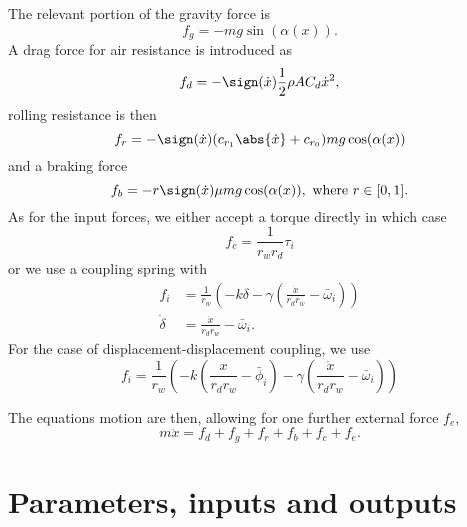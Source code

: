 \documentclass[10pt,notitlepage,abstracton]{scrartcl}
\theoremstyle{plain}
\theoremstyle{plain}
\theoremstyle{plain}
\begin{document}
The relevant portion of the gravity force is
\begin{equation}
  \label{eq:1}
  f_{g} = - m g \sin(\alpha ( x ) ).
\end{equation}
A drag force for air resistance is introduced as
\begin{equation}
  \label{eq:2}
  f_{d} = - \sign(\dot{x}) \frac{1}{2}\rho A C_{d} \dot{x}^{2},  
\end{equation}
rolling resistance is then
\begin{equation}
  \label{eq:3}
  f_{r} = - \sign(\dot{x})(c_{r_{1}}\abs{\dot{x}} + c_{r_{0}}) m g \cos(\alpha(x))
\end{equation}
and a braking force
\begin{equation}
  \label{eq:4}
  f_{b} = - r \sign(\dot{x})\mu m g \cos(\alpha(x)), \text{ where }   r\in[0,1].
\end{equation}
As for the input forces, we either accept a torque directly in which case
\begin{equation}
  \label{eq:5}
  f_{c} = \frac{1}{r_{w}r_{d}}\tau_{i}
\end{equation}
or we use a coupling spring with
\begin{equation}
  \label{eq:6}
  \begin{split}
    f_{i} &= \frac{1}{r_{w}} \left( -k \delta -
      \gamma( \frac{\dot{x}}{r_{d}r_{w}} - \bar{\omega}_{i} ) \right) \\
    \dot{\delta} &= \frac{\dot{x}}{r_{d}r_{w}} - \bar{\omega}_{i}. 
  \end{split}
\end{equation}
For the case of displacement-displacement coupling, we use 
\begin{equation}
  \label{eq:8}
    f_{i} = \frac{1}{r_{w}} \left( -k (\frac{x}{r_{d}r_{w}} - \bar{\phi}_{i})  -
      \gamma( \frac{\dot{x}}{r_{d}r_{w}} - \bar{\omega}_{i} ) \right) 
\end{equation}



The equations motion are then, allowing for one further external force $f_{e}$, 
\begin{equation}
  \label{eq:7}
  m\ddot{x} = f_{d} + f_{g} + f_{r} + f_{b} + f_{c} + f_{e}. 
\end{equation}


\section{Parameters, inputs and outputs}
\label{sec:param-inputs-outp}
\end{document}
